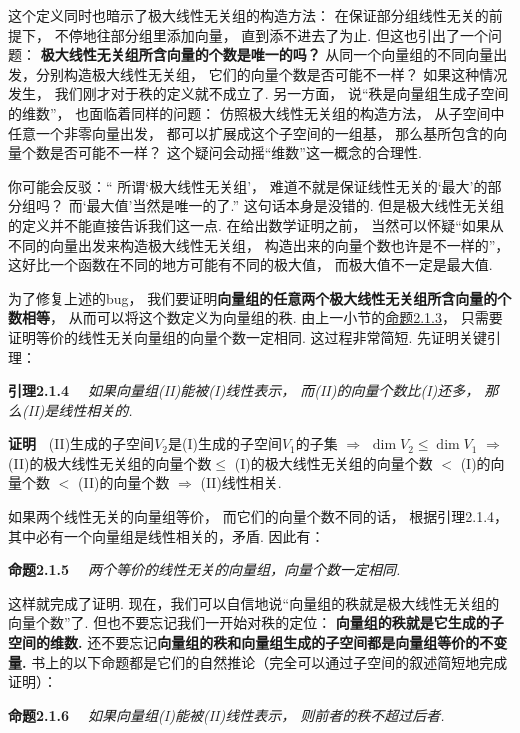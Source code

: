 这个定义同时也暗示了极大线性无关组的构造方法：
在保证部分组线性无关的前提下，
不停地往部分组里添加向量，
直到添不进去了为止.
但这也引出了一个问题：
\textbf{极大线性无关组所含向量的个数是唯一的吗？}
从同一个向量组的不同向量出发，分别构造极大线性无关组，
它们的向量个数是否可能不一样？
如果这种情况发生，
我们刚才对于秩的定义就不成立了.
另一方面，
说“秩是向量组生成子空间的维数”，
也面临着同样的问题：
仿照极大线性无关组的构造方法，
从子空间中任意一个非零向量出发，
都可以扩展成这个子空间的一组基，
那么基所包含的向量个数是否可能不一样？
这个疑问会动摇“维数”这一概念的合理性.

你可能会反驳：“
所谓‘极大线性无关组’，
难道不就是保证线性无关的‘最大’的部分组吗？
而‘最大值’当然是唯一的了.”
这句话本身是没错的.
但是极大线性无关组的定义并不能直接告诉我们这一点.
在给出数学证明之前，
当然可以怀疑“如果从不同的向量出发来构造极大线性无关组，
构造出来的向量个数也许是不一样的”，
这好比一个函数在不同的地方可能有不同的极大值，
而极大值不一定是最大值.

为了修复上述的bug，
我们要证明\textbf{向量组的任意两个极大线性无关组所含向量的个数相等}，
从而可以将这个数定义为向量组的秩.
由上一小节的\hyperlink{prop5}{命题2.1.3}，
只需要证明等价的线性无关向量组的向量个数一定相同.
这过程非常简短.
先证明关键引理：

\medskip
\textbf{引理2.1.4}
\textit{~~如果向量组(II)能被(I)线性表示，
而(II)的向量个数比(I)还多，
那么(II)是线性相关的.}

\textbf{证明\ } (II)生成的子空间$V_2$是(I)生成的子空间$V_1$的子集
$\Longrightarrow$
$\dim V_2 \le \dim V_1$
$\Longrightarrow$
(II)的极大线性无关组的向量个数$\le$
(I)的极大线性无关组的向量个数
$<$
(I)的向量个数
$<$
(II)的向量个数
$\Longrightarrow$
(II)线性相关.\medskip

如果两个线性无关的向量组等价，
而它们的向量个数不同的话，
根据引理2.1.4，
其中必有一个向量组是线性相关的，矛盾.
因此有：


\medskip

\textbf{命题2.1.5}
\textit{~~两个等价的线性无关的向量组，向量个数一定相同.}\medskip


这样就完成了证明.
现在，我们可以自信地说“向量组的秩就是极大线性无关组的向量个数”了.
但也不要忘记我们一开始对秩的定位：
\textbf{向量组的秩就是它生成的子空间的维数.}
还不要忘记\textbf{向量组的秩和向量组生成的子空间都是向量组等价的不变量.}
书上的以下命题都是它们的自然推论（完全可以通过子空间的叙述简短地完成证明）：

\medskip

\textbf{命题2.1.6}
\textit{~~如果向量组(I)能被(II)线性表示，
则前者的秩不超过后者.}

